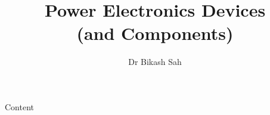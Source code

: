 \documentclass{../course_template/lectureClass}
\begin{document}

\title[Power Electronics Devices]{Power Electronics Devices \\ (and Components)}
\author{Dr Bikash Sah}
\date{}
\begin{frame}[plain]
    \titlepage
\end{frame}

\begin{frame}{Content}
    \tableofcontents
\end{frame}


%

\end{document}
